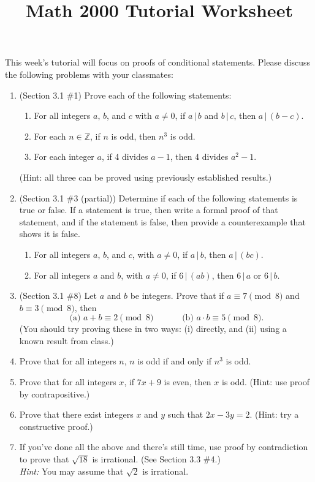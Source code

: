 \documentclass[letterpaper,12pt]{article}
\title{Math 2000 Tutorial Worksheet}
\newcommand{\divs}[2]{#1 \, | \, #2}
\renewcommand{\cong}[3]{#1 \equiv #2 \pmod{#3}}
\begin{document}
\maketitle

 This week's tutorial will focus on proofs of conditional statements. Please discuss the following problems with your classmates:
\begin{enumerate}
 \item (Section 3.1 \#1) Prove each of the following statements:
\begin{enumerate}
 \item For all integers $a$, $b$, and $c$ with $a\neq 0$, if $\divs{a}{b}$ and $\divs{b}{c}$, then $\divs{a}{(b-c)}$.
 \item For each $n\in\mathbb{Z}$, if $n$ is odd, then $n^3$ is odd.
 \item For each integer $a$, if 4 divides $a-1$, then 4 divides $a^2-1$.
\end{enumerate}
(Hint: all three can be proved using previously established results.)

\item (Section 3.1 \#3 (partial)) Determine if each of the following statements is true or false. If a statement is true, then write a formal proof of that statement, and if the statement is false, then provide a counterexample that shows it is false.
\begin{enumerate}
 \item For all integers $a$, $b$, and $c$, with $a\neq 0$, if $\divs{a}{b}$, then $\divs{a}{(bc)}$.
 \item For all integers $a$ and $b$, with $a\neq 0$, if $\divs{6}{(ab)}$, then $\divs{6}{a}$ or $\divs{6}{b}$.
\end{enumerate}
\item (Section 3.1 \#8) Let $a$ and $b$ be integers. Prove that if $\cong{a}{7}{8}$ and $\cong{b}{3}{8}$, then
\[
 \text{(a) }\cong{a+b}{2}{8} \quad\quad\quad \text{ (b) } \cong{a\cdot b}{5}{8}.
\]
(You should try proving these in two ways: (i) directly, and (ii) using a known result from class.)

\item Prove that for all integers $n$, $n$ is odd if and only if $n^3$ is odd.

\item Prove that for all integers $x$, if $7x+9$ is even, then $x$ is odd. (Hint: use proof by contrapositive.)

\item Prove that there exist integers $x$ and $y$ such that $2x-3y = 2$. (Hint: try a constructive proof.)

\item If you've done all the above and there's still time, use proof by contradiction to prove that $\sqrt{18}$ is irrational. (See Section 3.3 \#4.)\\
{\em Hint:} You may assume that $\sqrt{2}$ is irrational.
\end{enumerate}
\end{document}
